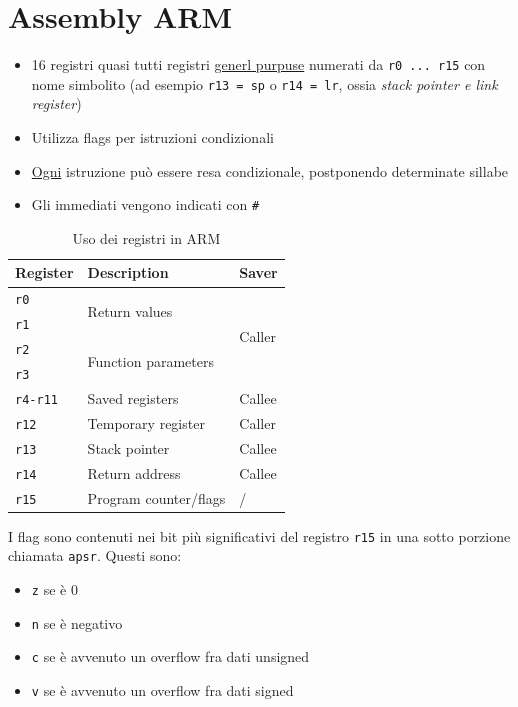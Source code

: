 \section{Assembly ARM}
\begin{itemize}
	\item 16 registri quasi tutti registri \underline{generl purpuse} numerati da \verb|r0 ... r15| con nome simbolito (ad esempio \verb|r13 = sp| o \verb|r14 = lr|, ossia \textit{stack pointer e link register})
	\item Utilizza flags per istruzioni condizionali
    \item \underline{Ogni} istruzione può essere resa condizionale, postponendo determinate sillabe
	\item Gli immediati vengono indicati con \verb|#|
\end{itemize}
\begin{table}[H]
	\begin{center}
		\begin{tabular}{|l|l|l|}
			\hline
      Register      & Description      & Saver        \\
			\hline
      \verb|r0|     & \multirow{2}{*}{Return values} & \multirow{4}{*}{Caller}   \\
      \verb|r1|     &          &                \\
      \cline{2-2}
      \verb|r2| &\multirow{2}{*}{Function parameters} &\\
      \verb|r3| & &\\
      \hline
      \verb|r4-r11| & Saved registers & Callee \\
      \hline
      \verb|r12| & Temporary register   & Caller            \\
      \verb|r13| & Stack pointer    & Callee        \\
      \verb|r14|    &  Return address  & Callee        \\
      \verb|r15|    & Program counter/flags & /   \\
			\hline
		\end{tabular}
	\end{center}
	\caption{Uso dei registri in ARM}
\end{table}
I flag sono contenuti nei bit più significativi del registro \verb|r15| in una sotto porzione chiamata \verb|apsr|. Questi sono:
\begin{itemize}
	\item \verb|z| se è 0
	\item \verb|n| se è negativo
  \item \verb|c| se è avvenuto un overflow fra dati unsigned
	\item \verb|v| se è avvenuto un overflow fra dati signed
\end{itemize}
